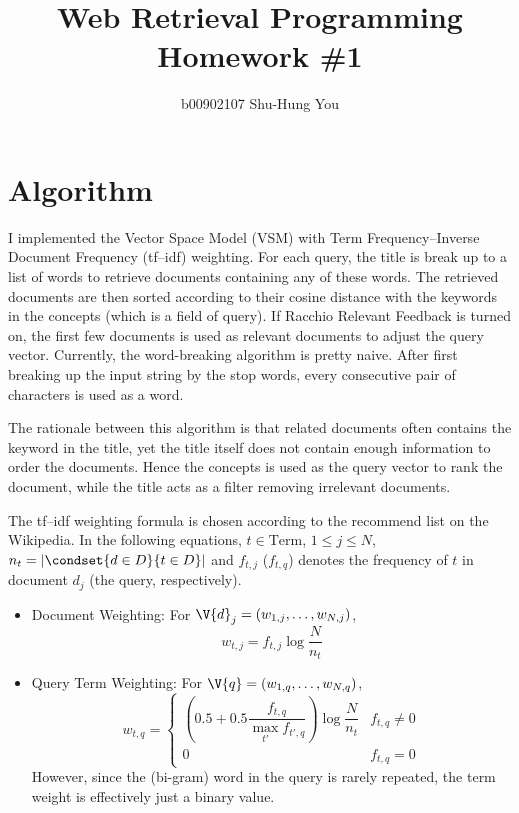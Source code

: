 \documentclass{article}
\begin{document}
\title{Web Retrieval Programming Homework \#1}
\date{}
\author{b00902107 Shu-Hung You}
\maketitle
\section{Algorithm}
I implemented the Vector Space Model (VSM) with Term Frequency--Inverse
Document Frequency (tf--idf) weighting. For each query, the title is break
up to a list of words to retrieve documents containing any of these words.
The retrieved documents are then sorted according to their cosine distance
with the keywords in the concepts (which is a field of query). If Racchio
Relevant Feedback is turned on, the first few documents is used as relevant
documents to adjust the query vector. Currently, the word-breaking algorithm
is pretty naive. After first breaking up the input string by the stop words,
every consecutive pair of characters is used as a word.

The rationale between this algorithm is that related documents often contains
the keyword in the title, yet the title itself does not contain enough
information to order the documents. Hence the concepts is used as the query
vector to rank the document, while the title acts as a filter removing irrelevant
documents.

The tf--idf weighting formula is chosen according to the recommend list
on the Wikipedia. In the following equations, $t\in\text{Term}$, $1\leq j\leq N$,
$n_t=|\condset{d\in D}{t\in D}|$ and $f_{t,j}$ ($f_{t,q}$) denotes the frequency of $t$ in
document $d_j$ (the query, respectively).
\begin{itemize}
  \item Document Weighting: For $\V{d}_j=(w_{1,j},\dots,w_{N,j})$,
        \[ w_{t,j}=f_{t,j}\log\frac{N}{n_t} \]
  \item Query Term Weighting: For $\V{q}=(w_{1,q},\dots,w_{N,q})$, 
        \[ w_{t,q}=\left\{\begin{array}{ll}
          \left(0.5+0.5\dfrac{f_{t,q}}{\max_{t'} f_{t',q}}\right)\log\dfrac{N}{n_t} & f_{t,q}\neq 0 \\ 0 & f_{t,q}=0
          \end{array}\right. \]
        However, since the (bi-gram) word in the query is rarely repeated, the term weight is
        effectively just a binary value.
\end{itemize}
\end{document}
